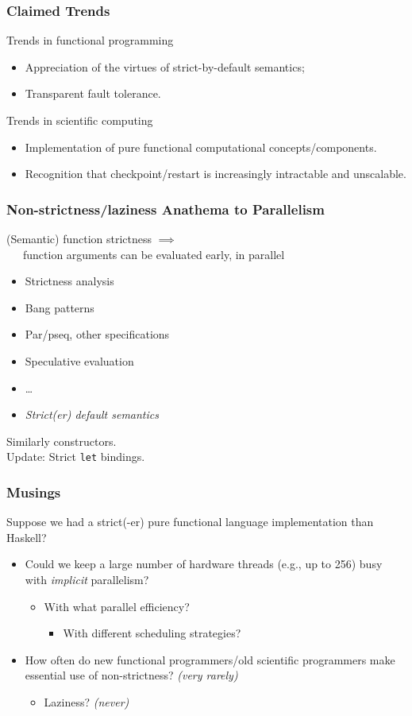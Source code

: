 \documentclass{beamer}
\begin{document}
\begin{frame}
\frametitle{Claimed Trends}
Trends in functional programming
\begin{itemize}
  \item Appreciation of the virtues of strict-by-default semantics;
  \item Transparent fault tolerance.
\end{itemize}
Trends in scientific computing
\begin{itemize}
  \item Implementation of pure functional computational concepts/components.
  \item Recognition that checkpoint/restart is increasingly intractable and unscalable.
\end{itemize}
\end{frame}


\begin{frame}
\frametitle{Non-strictness/laziness Anathema to Parallelism}
(Semantic) function strictness $\implies$ \\
\ \ \ function arguments can be evaluated early, in parallel

\begin{itemize}
  \item Strictness analysis
  \item Bang patterns
  \item Par/pseq, other specifications
  \item Speculative evaluation
  \item \ldots
  \item \emph{Strict(er) default semantics}
\end{itemize}
Similarly constructors.
\\\vspace{0.1in}
Update:  Strict \texttt{let} bindings.
\end{frame}


\begin{frame}
  \frametitle{Musings}
  Suppose we had a strict(-er) pure functional language implementation than Haskell?
  \begin{itemize}
  \item Could we keep a large number of hardware threads (e.g., up to 256) busy with
    \emph{implicit} parallelism?
    \begin{itemize}
    \item With what parallel efficiency?
      \begin{itemize}
      \item With different scheduling strategies?
      \end{itemize}
    \end{itemize}
  \item How often do new functional programmers/old scientific programmers
    make essential use of non-strictness?  \emph{(very rarely)}
    \begin{itemize}
    \item Laziness? \emph{(never)}
    \end{itemize}
  \end{itemize}
\end{frame}
\end{document}
